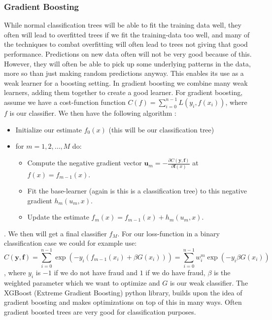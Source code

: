 \documentclass{article}
\begin{document}
\subsubsection{Gradient Boosting}
While normal classification trees will be able to fit the training data well,
they often will lead to overfitted trees if we fit the training-data too well,
and many of the techniques to combat overfitting will often lead to trees not
giving that good performance. Predictions on new data often will not be very
good because of this. However, they will often be able to pick up some
underlying patterns in the data, more so than just making random predictions
anyway. This enables its use as a weak learner for a boosting setting. In
gradient boosting we combine many weak learners, adding them together to create
a good learner. For gradient boosting, assume we have a cost-function function
$C(f) = \sum_{i=0}^{n-1} L(y_i, f(x_i))$, where $f$ is our classifier. We then
have the following algorithm \cite[s.~Gradient Boosting,
	algorithm]{lecturesweek46}:
\begin{itemize}
	\item Initialize our estimate $f_0(x)$ (this will be our classification tree)
	\item for $m = 1, 2, \dots, M$ do:
	      \begin{itemize}
		      \item Compute the negative gradient vector $\bm{u}_m = -\frac{\partial C(\bm{y}, \bm{f})}{\partial \bm{f}(x)}$ at $f(x) = f_{m - 1}(x)$.
		      \item Fit the base-learner (again is this is a classification tree) to this negative gradient $h_m(u_m, x)$.
		      \item Update the estimate $f_m(x) = f_{m-1}(x) + h_m(u_m, x)$.
	      \end{itemize}
\end{itemize}.
We then will get a final classifier $f_M$. For our loss-function in a
binary classification case we could for example use:
$$C(\bm{y}, \bm{f}) = \sum_{i=0}^{n-1} \exp(-y_i (f_{m-1}(x_i) + \beta G(x_i))) = \sum_{i=0}^{n-1} w_i^m \exp(-y_i \beta G(x_i))$$
, where $y_i$ is $-1$
if we do not have fraud and $1$ if we do have fraud, $\beta$ is the weighted
parameter which we want to optimize and $G$ is our weak classifier. The XGBoost
(Extreme Gradient Boosting) python library, builds upon the idea of gradient
boosting and makes optimizations on top of this in many ways. Often gradient
boosted trees are very good for classification purposes.
\end{document}
